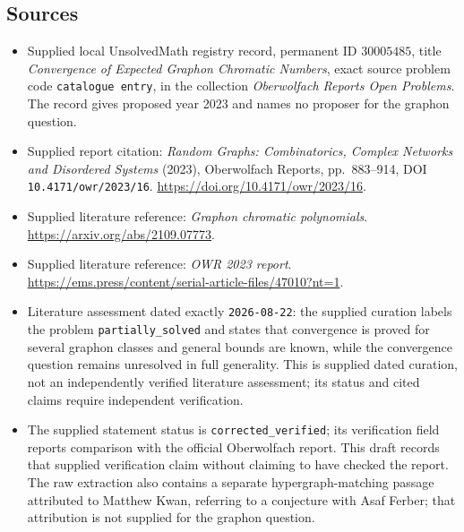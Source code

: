 \documentclass[11pt]{article}
\begin{document}
\subsection{Sources}
\begin{itemize}
\item Supplied local UnsolvedMath registry record, permanent ID \(30005485\), title \emph{Convergence of Expected Graphon Chromatic Numbers}, exact source problem code \texttt{catalogue entry}, in the collection \emph{Oberwolfach Reports Open Problems}. The record gives proposed year 2023 and names no proposer for the graphon question.
\item Supplied report citation: \emph{Random Graphs: Combinatorics, Complex Networks and Disordered Systems} (2023), Oberwolfach Reports, pp.\ 883--914, DOI \texttt{10.4171/owr/2023/16}. \url{https://doi.org/10.4171/owr/2023/16}.
\item Supplied literature reference: \emph{Graphon chromatic polynomials}. \url{https://arxiv.org/abs/2109.07773}.
\item Supplied literature reference: \emph{OWR 2023 report}. \url{https://ems.press/content/serial-article-files/47010?nt=1}.
\item Literature assessment dated exactly \texttt{2026-08-22}: the supplied curation labels the problem \texttt{partially\_solved} and states that convergence is proved for several graphon classes and general bounds are known, while the convergence question remains unresolved in full generality. This is supplied dated curation, not an independently verified literature assessment; its status and cited claims require independent verification.
\item The supplied statement status is \texttt{corrected\_verified}; its verification field reports comparison with the official Oberwolfach report. This draft records that supplied verification claim without claiming to have checked the report. The raw extraction also contains a separate hypergraph-matching passage attributed to Matthew Kwan, referring to a conjecture with Asaf Ferber; that attribution is not supplied for the graphon question.
\end{itemize}
\end{document}
